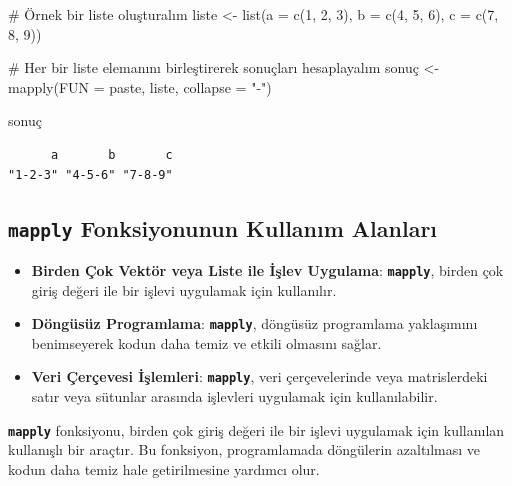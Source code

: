 \documentclass[
  letterpaper,
  DIV=11,
  numbers=noendperiod]{scrreprt}
\newenvironment{Shaded}{\begin{snugshade}}{\end{snugshade}}
\newcommand{\AttributeTok}[1]{\textcolor[rgb]{0.40,0.45,0.13}{#1}}
\newcommand{\CommentTok}[1]{\textcolor[rgb]{0.37,0.37,0.37}{#1}}
\newcommand{\DecValTok}[1]{\textcolor[rgb]{0.68,0.00,0.00}{#1}}
\newcommand{\FunctionTok}[1]{\textcolor[rgb]{0.28,0.35,0.67}{#1}}
\newcommand{\NormalTok}[1]{\textcolor[rgb]{0.00,0.23,0.31}{#1}}
\newcommand{\OtherTok}[1]{\textcolor[rgb]{0.00,0.23,0.31}{#1}}
\newcommand{\StringTok}[1]{\textcolor[rgb]{0.13,0.47,0.30}{#1}}
\begin{document}
\begin{Shaded}
\begin{Highlighting}[]
\CommentTok{\# Örnek bir liste oluşturalım}
\NormalTok{liste }\OtherTok{\textless{}{-}} \FunctionTok{list}\NormalTok{(}\AttributeTok{a =} \FunctionTok{c}\NormalTok{(}\DecValTok{1}\NormalTok{, }\DecValTok{2}\NormalTok{, }\DecValTok{3}\NormalTok{), }\AttributeTok{b =} \FunctionTok{c}\NormalTok{(}\DecValTok{4}\NormalTok{, }\DecValTok{5}\NormalTok{, }\DecValTok{6}\NormalTok{), }\AttributeTok{c =} \FunctionTok{c}\NormalTok{(}\DecValTok{7}\NormalTok{, }\DecValTok{8}\NormalTok{, }\DecValTok{9}\NormalTok{))}

\CommentTok{\# Her bir liste elemanını birleştirerek sonuçları hesaplayalım}
\NormalTok{sonuç }\OtherTok{\textless{}{-}} \FunctionTok{mapply}\NormalTok{(}\AttributeTok{FUN =}\NormalTok{ paste, liste, }\AttributeTok{collapse =} \StringTok{"{-}"}\NormalTok{)}

\NormalTok{sonuç}
\end{Highlighting}
\end{Shaded}

\begin{verbatim}
      a       b       c 
"1-2-3" "4-5-6" "7-8-9" 
\end{verbatim}

\subsection{\texorpdfstring{\textbf{\texttt{mapply} Fonksiyonunun
Kullanım
Alanları}}{mapply Fonksiyonunun Kullanım Alanları}}\label{mapply-fonksiyonunun-kullanux131m-alanlarux131}

\begin{itemize}
\item
  \textbf{Birden Çok Vektör veya Liste ile İşlev Uygulama}:
  \textbf{\texttt{mapply}}, birden çok giriş değeri ile bir işlevi
  uygulamak için kullanılır.
\item
  \textbf{Döngüsüz Programlama}: \textbf{\texttt{mapply}}, döngüsüz
  programlama yaklaşımını benimseyerek kodun daha temiz ve etkili
  olmasını sağlar.
\item
  \textbf{Veri Çerçevesi İşlemleri}: \textbf{\texttt{mapply}}, veri
  çerçevelerinde veya matrislerdeki satır veya sütunlar arasında
  işlevleri uygulamak için kullanılabilir.
\end{itemize}

\textbf{\texttt{mapply}} fonksiyonu, birden çok giriş değeri ile bir
işlevi uygulamak için kullanılan kullanışlı bir araçtır. Bu fonksiyon,
programlamada döngülerin azaltılması ve kodun daha temiz hale
getirilmesine yardımcı olur.
\end{document}
